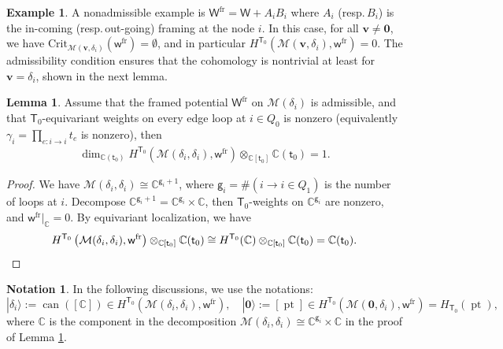 \documentclass[10pt]{amsart}
\theoremstyle{definition}
\newtheorem{Lemma}[Theorem]{Lemma}
\newtheorem{Example}[Theorem]{Example}
\newtheorem{Notation}[Theorem]{Notation}
\numberwithin{equation}{section}
\newcommand{\Crit}{\mathrm{Crit}}
\newcommand{\bC}{\mathbb{C}}
\newcommand{\bv}{\mathbf{v}}
\newcommand{\cM}{\mathcal{M}}
\newcommand{\sT}{\mathsf{T}}
\newcommand{\sW}{\mathsf{W}}
\newcommand{\sw}{\mathsf{w}}
\newcommand{\can}{\operatorname{can}}
\newcommand{\pt}{\operatorname{pt}}
\begin{document}
\begin{Example}
A nonadmissible example is $\sW^{\mathrm{fr}}=\sW+A_iB_i$ where $A_i$ (resp.\,$B_i$) is the in-coming (resp.\,out-going) framing at the node $i$. In this case, for all $\bv\neq \mathbf 0$, we have $\Crit_{\cM(\bv,\delta_i)}(\sw^{\mathrm{fr}})=\emptyset$, and in particular $H^{\sT_0}(\cM(\bv,\delta_i),\sw^{\mathrm{fr}})=0$. The admissibility condition ensures that the cohomology is nontrivial at least for $\bv=\delta_i$, shown in the next lemma.
\end{Example}

\begin{Lemma}\label{lem 1st excitation}
Assume that the framed potential 
$\sW^{\mathrm{fr}}$ on $\cM(\delta_i)$ is admissible, and that $\sT_0$-equivariant weights on every edge loop at $i\in Q_0$ is nonzero (equivalently $\gamma_i=\prod_{e:i\to i}t_e$ is nonzero), then 
\begin{align*}
\dim_{\bC(\mathsf t_0)}H^{\sT_0}\left(\cM(\delta_i,\delta_i),\sw^{\mathrm{fr}}\right)\otimes_{\bC[\mathsf t_0]} \bC(\mathsf t_0)=1.
\end{align*}
\end{Lemma}

\begin{proof}
We have $\cM(\delta_i,\delta_i)\cong \bC^{\mathsf g_i+1}$, where $\mathsf g_i=\#(i\to i\in Q_1)$ is the number of loops at $i$. Decompose $\bC^{\mathsf g_i+1}=\bC^{\mathsf g_i}\times \bC$, then $\sT_0$-weights on $\bC^{\mathsf g_i}$ are nonzero, and $\sw^{\mathrm{fr}}\big|_{\bC}=0$. 
By equivariant localization, we have 
\begin{equation*}
    H^{\sT_0}\left(\cM(\delta_i,\delta_i),\sw^{\mathrm{fr}}\right)\otimes_{\bC[\mathsf t_0]} \bC(\mathsf t_0)\cong H^{\sT_0}(\bC)\otimes_{\bC[\mathsf t_0]}\bC(\mathsf t_0)=\bC(\mathsf t_0). \qedhere
\end{equation*}
\end{proof}

\begin{Notation}\label{ground and 1st excitation}
In the following discussions, we use the notations:
$$|\delta_i\rangle:=\can([\bC])\in H^{\sT_0}\left(\cM(\delta_i,\delta_i),\sw^{\mathrm{fr}}\right),\quad |\mathbf 0\rangle:=[\pt]\in H^{\sT_0}\left(\cM(\mathbf 0,\delta_i),\sw^{\mathrm{fr}}\right)=H_{\sT_0}(\pt),$$ where $\bC$ is the component in the decomposition $\cM(\delta_i,\delta_i)\cong \bC^{\mathsf g_i}\times \bC$ in the proof of Lemma \ref{lem 1st excitation}.
\end{Notation}
\end{document}
